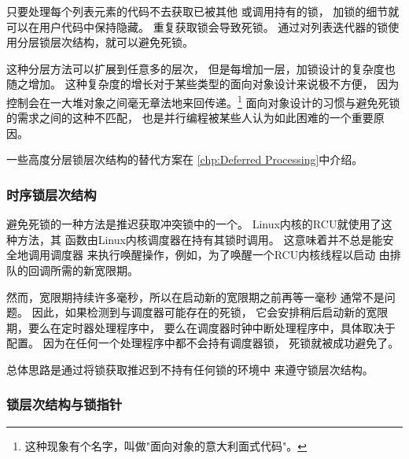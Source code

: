 只要处理每个列表元素的代码不去获取已被其他
或调用持有的锁，
加锁的细节就可以在用户代码中保持隐藏。
重复获取锁会导致死锁。
通过对列表迭代器的锁使用分层锁层次结构，就可以避免死锁。

这种分层方法可以扩展到任意多的层次，
但是每增加一层，加锁设计的复杂度也随之增加。
这种复杂度的增长对于某些类型的面向对象设计来说极不方便，
因为控制会在一大堆对象之间毫无章法地来回传递。\footnote{
	这种现象有个名字，叫做"面向对象的意大利面式代码"。}
面向对象设计的习惯与避免死锁的需求之间的这种不匹配，
也是并行编程被某些人认为如此困难的一个重要原因。

一些高度分层锁层次结构的替代方案在
\cref{chp:Deferred Processing}中介绍。

\subsubsection{时序锁层次结构}
\label{sec:locking:Temporal Locking Hierarchies}

避免死锁的一种方法是推迟获取冲突锁中的一个。
Linux内核的RCU就使用了这种方法，其
函数由Linux内核调度器在持有其锁时调用。
这意味着并不总是能安全地调用调度器
来执行唤醒操作，例如，为了唤醒一个RCU内核线程以启动
由排队的回调所需的新宽限期。

\QuickQuizEnd

然而，宽限期持续许多毫秒，所以在启动新的宽限期之前再等一毫秒
通常不是问题。
因此，如果检测到与调度器可能存在的死锁，
它会安排稍后启动新的宽限期，要么在定时器处理程序中，
要么在调度器时钟中断处理程序中，具体取决于配置。
因为在任何一个处理程序中都不会持有调度器锁，
死锁就被成功避免了。

总体思路是通过将锁获取推迟到不持有任何锁的环境中
来遵守锁层次结构。

\subsubsection{锁层次结构与锁指针}
\label{sec:locking:Locking Hierarchies and Pointers to Locks}

